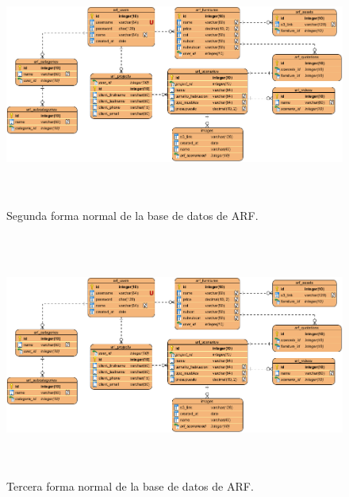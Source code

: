 \begin{figure}[H]
\centering
\includegraphics[width=16cm,height=8cm]{imagenes/desarrollo/arquitectura/ERD.png}
\caption{Segunda forma normal de la base de datos de ARF.}
\label{fig:erd2}
\end{figure}
\begin{figure}[H]
\centering
\includegraphics[width=16cm,height=8cm]{imagenes/desarrollo/arquitectura/ERD.png}
\caption{Tercera forma normal de la base de datos de ARF.}
\label{fig:erd}
\end{figure}
